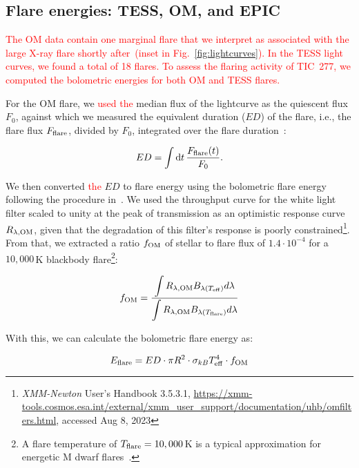 \documentclass[twocolumn]{aastex631}
\begin{document}
\subsection{Flare energies: TESS, OM, and EPIC}
\label{sec:methods:flareenergies}
\textcolor{red}{The OM data contain one marginal flare that we interpret as associated with the large X-ray flare shortly after~(inset in Fig.~\ref{fig:lightcurves}). In the TESS light curves, we found a total of 18 flares. To assess the flaring activity of TIC~277, we computed the bolometric energies for both OM and TESS flares.} 

For the OM flare, we \textcolor{red}{used the} median flux of the lightcurve as the quiescent flux $F_0$, against which we measured the equivalent duration ($ED$) of the flare, i.e., the flare flux $F_{\rm flare}$, divided by $F_0$, integrated over the flare duration~\citep{gershberg1972results}:

\begin{equation}
\label{eq:ED}
ED=\displaystyle \int \mathrm dt\, \frac{F_{\rm flare}(t)}{F_0}.
\end{equation}

We then converted \textcolor{red}{the} $ED$ to flare energy using the bolometric flare energy following the procedure in~\citet{shibayama2013superflares}. We used the throughput curve for the white light filter scaled to unity at the peak of transmission as an optimistic response curve $R_{\lambda, \rm OM}$, given that the degradation of this filter's response is poorly constrained\footnote{\textit{XMM-Newton} User's Handbook 3.5.3.1, \url{https://xmm-tools.cosmos.esa.int/external/xmm_user_support/documentation/uhb/omfilters.html}, accessed Aug 8, 2023}. From that, we extracted a ratio $f_{\rm OM}$ of stellar to flare flux of $1.4\cdot 10^{-4}$ for a $10,000\,$K blackbody flare\footnote{A flare temperature of $T_{\rm flare}=10,000\,$K is a typical approximation for energetic M dwarf flares~\citep{kowalski2013timeresolved, howard2020evryflarea}.}:

\begin{equation}
    f_{\rm OM} = \frac{\displaystyle\int R_{\lambda, \rm OM} B_{\lambda(T_{\rm eff})}  d\lambda}{\displaystyle\int R_{\lambda, \rm OM} B_{\lambda(T_{\rm flare})} d\lambda} 
    \label{eq:ratio}
\end{equation}

With this, we can calculate the bolometric flare energy as:

\begin{equation}
    E_{\rm flare} = ED \cdot \pi R^2 \cdot \sigma_{kB} T_{\rm eff}^4 \cdot f_{\rm OM}
    \label{eq:eflare}
\end{equation}
\end{document}
